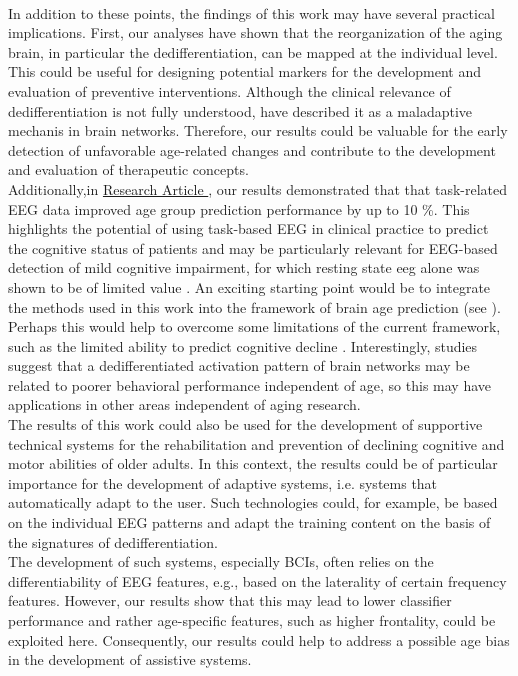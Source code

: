 \\
In addition to these points, the findings of this work may have several practical implications. First, our analyses have shown that the reorganization of the aging brain, in particular the dedifferentiation, can be mapped at the individual level. This could be useful for designing potential markers for the development and evaluation of preventive interventions. Although the clinical relevance of dedifferentiation is not fully understood, \citeauthor{Fornito2015} \cite{Fornito2015} have described it as a maladaptive mechanis in brain networks. Therefore, our results could be valuable for the early detection of unfavorable age-related changes and contribute to the development and evaluation of therapeutic concepts.\\
Additionally,in \hyperref[results:paperII]{Research Article }, our results demonstrated that that task-related EEG data improved age group prediction performance by up to 10 \%. This highlights the potential of using task-based EEG in clinical practice to predict the cognitive status of patients and may be particularly relevant for EEG-based detection of mild cognitive impairment, for which resting state \gls{eeg} alone was shown to be of limited value \cite{Froehlich2021, Farina2020}. An exciting starting point would be to integrate the methods used in this work into the framework of brain age prediction (see ). Perhaps this would help to overcome some limitations of the current framework, such as the limited ability to predict cognitive decline \cite{Tetereva2023}. Interestingly, studies suggest that a dedifferentiated activation pattern of brain networks may be related to poorer behavioral performance independent of age, so this may have applications in other areas independent of aging research.\\
The results of this work could also be used for the development of supportive technical systems for the rehabilitation and prevention of declining cognitive and motor abilities of older adults. In this context, the results could be of particular importance for the development of adaptive systems, i.e. systems that automatically adapt to the user. Such technologies could, for example, be based on the individual EEG patterns and adapt the training content on the basis of the signatures of dedifferentiation.\\
The development of such systems, especially BCIs, often relies on the differentiability of EEG features, e.g., based on the laterality of certain frequency features. However, our results show that this may lead to lower classifier performance and rather age-specific features, such as higher frontality, could be exploited here. Consequently, our results could help to address a possible age bias in the development of assistive systems.

